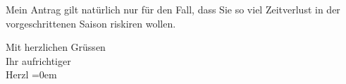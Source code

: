 \pstart
           Mein Antrag gilt natürlich nur für
      den Fall, dass Sie so viel Zeitverlust
      in der vorgeschrittenen Saison
      riskiren wollen.\pend
           
\pstart
           Mit herzlichen Grüssen{\\[\baselineskip]}Ihr aufrichtiger{\\[\baselineskip]}\spacefill\mbox{Herzl}\pend
           \leftskip=0em{}\endnumbering{}
\begin{anhang}
\end{anhang}\newcommand{\dateiname}{L03840}\newcommand{\titel}{Theodor Herzl an Arthur Schnitzler, 23. 12. 1894}\newcommand{\editorInnen}{Selma Jahnke und Martin Anton Müller}
